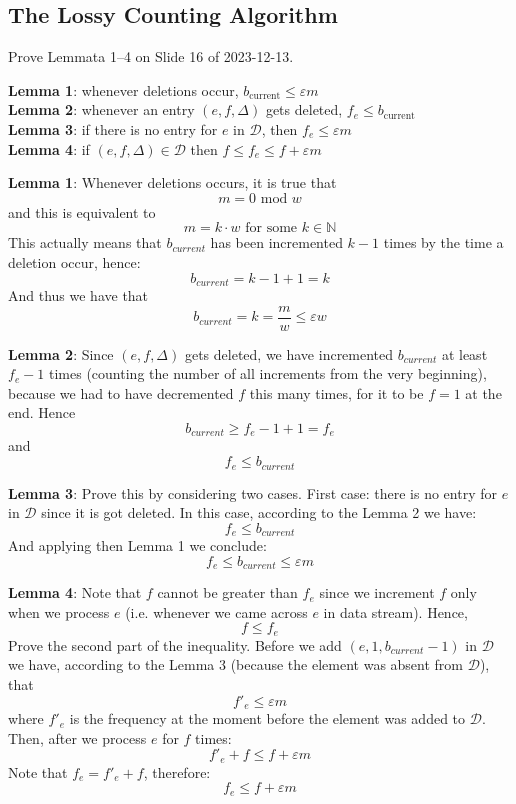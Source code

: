 \documentclass{article}
\let\epsilon\varepsilon
\begin{document}
  \subsection{The Lossy Counting Algorithm}
  \begin{centerframebox}
    Prove Lemmata 1--4 on Slide 16 of 2023-12-13.

    \textbf{Lemma 1}: whenever deletions occur, $b_\mathrm{current} \leq \epsilon m$ \\
    \textbf{Lemma 2}: whenever an entry $(e, f, \Delta)$ gets deleted, $f_e \leq b_\mathrm{current}$ \\
    \textbf{Lemma 3}: if there is no entry for $e$ in $\mathcal{D}$, then $f_e \leq \epsilon m$ \\
    \textbf{Lemma 4}: if $(e, f, \Delta) \in \mathcal{D}$ then $f \leq f_e \leq f + \epsilon m$
  \end{centerframebox}
    \textbf{Lemma 1}:
    Whenever deletions occurs, it is true that
    $$ m = 0 \text{ mod } w $$
    and this is equivalent to
    $$ m = k \cdot w \text{ for some } k \in \mathbb N$$
    This actually means that $b_{current}$ has been incremented $k-1$ times by the time a deletion occur, hence:
    $$b_{current} = k - 1 + 1 = k$$
    And thus we have that
    $$b_{current} = k = \frac{m}{w} \leq \epsilon w$$

    \textbf{Lemma 2}:
    Since $(e, f, \Delta)$ gets deleted, we have incremented $b_{current}$ at least $f_{e} - 1$ times (counting the number of all increments from the very beginning), because we had to have decremented $f$ this many times, for it to be $f=1$ at the end.
    Hence
    $$b_{current} \geq f_{e} - 1 + 1 = f_{e}$$
    and
    $$f_{e} \leq b_{current}$$

    \textbf{Lemma 3}: Prove this by considering two cases. First case: there is no entry for $e$ in $\mathcal{D}$ since it is got deleted. In this case, according to the Lemma 2 we have:
    $$f_e \leq b_{current}$$
    And applying then Lemma 1 we conclude:
    $$f_e \leq b_{current} \leq \epsilon m$$

    \textbf{Lemma 4}:
    Note that $f$ cannot be greater than $f_e$ since we increment $f$ only when we process $e$ (i.e. whenever we came across $e$ in data stream). Hence,
    $$f \leq f_e$$
    Prove the second part of the inequality.
    Before we add $(e, 1, b_{current} - 1)$ in $\mathcal{D}$ we have, according to the Lemma 3 (because the element was absent from $\mathcal{D}$), that
    $$f'_{e} \leq \epsilon m$$
    where $f'_{e}$ is the frequency at the moment before the element was added to $\mathcal{D}$.
    Then, after we process $e$ for $f$ times:
    $$f'_{e} + f \leq f + \epsilon m$$
    Note that $f_e = f'_{e} + f$, therefore:
    $$f_{e} \leq f + \epsilon m$$
\end{document}
